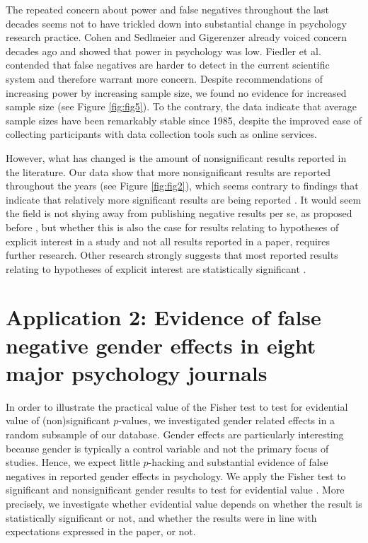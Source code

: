 \documentclass{article}
\begin{document}
The repeated concern about power and false negatives throughout the last decades seems not to have trickled down into substantial change in psychology research practice. Cohen \cite{Cohen1962-jc} and Sedlmeier and Gigerenzer \cite{Sedlmeier1989-yc} already voiced concern decades ago and showed that power in psychology was low. Fiedler et al. \cite{Fiedler2012-gx} contended that false negatives are harder to detect in the current scientific system and therefore warrant more concern. Despite recommendations of increasing power by increasing sample size, we found no evidence for increased sample size (see Figure \ref{fig:fig5}). To the contrary, the data indicate that average sample sizes have been remarkably stable since 1985, despite the improved ease of collecting participants with data collection tools such as online services.

However, what has changed is the amount of nonsignificant results reported in the literature. Our data show that more nonsignificant results are reported throughout the years (see Figure \ref{fig:fig2}), which seems contrary to findings that indicate that relatively more significant results are being reported \cite{Fanelli2011-xa, Sterling1995-fe, Sterling1959-pf,De_Winter2015-ru}. It would seem the field is not shying away from publishing negative results per se, as proposed before \cite{Fanelli2011-xa,Greenwald1975-ck,Nosek2012-aw,Rosenthal1979-lx,Schimmack2012-du}, but whether this is also the case for results relating to hypotheses of explicit interest in a study and not all results reported in a paper, requires further research. Other research strongly suggests that most reported results relating to hypotheses of explicit interest are statistically significant \cite{Open_Science_Collaboration2015-zs}.

\section*{Application 2: Evidence of false negative gender effects in eight major psychology journals}

In order to illustrate the practical value of the Fisher test to test for evidential value of (non)significant $p$-values, we investigated gender related effects in a random subsample of our database. Gender effects are particularly interesting because gender is typically a control variable and not the primary focus of studies. Hence, we expect little $p$-hacking and substantial evidence of false negatives in reported gender effects in psychology. We apply the Fisher test to significant and nonsignificant gender results to test for evidential value \cite{Van_Assen2015-gg,Simonsohn2014-dm}. More precisely, we investigate whether evidential value depends on whether the result is statistically significant or not, and whether the results were in line with expectations expressed in the paper, or not.
\end{document}
